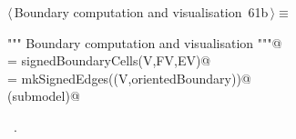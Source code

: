 \documentclass[11pt,oneside]{article}    %
\begin{document}
\begin{flushleft} \small \label{scrap116}
\protect{}$\langle\,$Boundary computation and visualisation\nobreak\ {\footnotesize 61b}$\,\rangle\equiv$
\vspace{-1ex}
\begin{list}{}{} \item
\mbox{}\verb@""" Boundary computation and visualisation """@\\
\mbox{}\verb@orientedBoundary = signedBoundaryCells(V,FV,EV)@\\
\mbox{}\verb@submodel = mkSignedEdges((V,orientedBoundary))@\\
\mbox{}\verb@VIEW(submodel)@\\
\mbox{}\verb@@{\NWsep}
\end{list}
\vspace{-1ex}
\footnotesize\addtolength{\baselineskip}{-1ex}
\begin{list}{}{\setlength{\itemsep}{-\parsep}\setlength{\itemindent}{-\leftmargin}}
\item \NWtxtMacroRefIn\ .
\end{list}
\end{flushleft}
\end{document}
